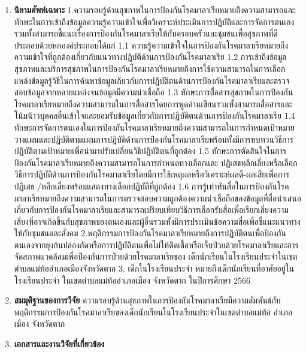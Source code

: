\begin{titlepage}
\begin{flushleft}
\begin{enumerate}
    \item\textbf{นิยามศัพท์เฉพาะ}
    1.ความรอบรู้ด้านสุขภาพในการป้องกันโรคมาลาเรียหมายถึงความสามารถและทักษะในการเข้าถึงข้อมูลความรู้ความเข้าใจเพื่อวิเคราะห์ประเมินการปฏิบัติและการจัดการตนเองรวมทั้งสามารถชี้แนะเรื่องการป้องกันโรคมาลาเรียให้กับครอบครัวและชุมชนเพื่อสุขภาพที่ดีประกอบด้วยหกองค์ประกอบได้แก่
1.1 ความรู้ความเข้าใจในการป้องกันโรคมาลาเรียหมายถึงความเข้าใจที่ถูกต้องเกี่ยวกับแนวทางปฏิบัติด้านการป้องกันโรคมาลาเรีย
1.2 การเข้าถึงข้อมูลสุขภาพและบริการสุขภาพในการป้องกันโรคมาลาเรียหมายถึงการใช้ความสามารถในการเลือกแหล่งข้อมูลรู้วิธีในการค้นหาข้อมูลเกี่ยวกับการปฏิบัติตนด้านการป้องกันโรคมาลาเรียและตรวจสอบข้อมูลจากหลายแหล่งจนข้อมูลมีความน่าเชื่อถือ 
1.3 ทักษะการสื่อสารสุขภาพในการป้องกันโรคมาลาเรียหมายถึงความสามารถในการสื่อสารโดยการพูดอ่านเขียนรวมทั้งสามารถสื่อสารและโน้มน้าวบุคคลอื่นเข้าใจและยอมรับข้อมูลเกี่ยวกับการปฏิบัติตนด้านการป้องกันโรคมาลาเรีย
1.4 ทักษะการจัดการตนเองในการป้องกันโรคมาลาเรียหมายถึงความสามารถในการกำหนดเป้าหมายวางแผนและปฏิบัติตามแผนการปฎิบัติด้านการป้องกันโรคมาลาเรียพร้อมทั้งมีการทบทวนวิธีการปฏิบัติตามเป้าหมายเพื่อนำมาปรับเปลี่ยนวิธีปฏิบัติตนที่ถูกต้อง
1.5 ทักษะการตัดสินใจในการป้องกันโรคมาลาเรียหมายถึงความสามารถในการกำหนดทางเลือกและ ปฏิเสธหลีกเลี่ยงหรือเลือกวิธีการปฏิบัติด้านการป้องกันโรคมาลาเรียโดยมีการใช้เหตุผลหรือวิเคราะห์ผลดี-ผลเสียเพื่อการปฏิเสธ /หลีกเลี่ยงพร้อมแสดงทางเลือกปฏิบัติที่ถูกต้อง
1.6 การรู้เท่าทันสื่อในการป้องกันโรคมาลาเรียหมายถึงความสามารถในการตรวจสอบความถูกต้องความน่าเชื่อถือของข้อมูลที่สื่อนำเสนอเกี่ยวกับการป้องกันโรคมาลาเรียและสามารถเปรียบเทียบวิธีการเลือกรับสื่อเพื่อเรียกเลี่ยงความเสี่ยงที่อาจเกิดขึ้นกับสุขภาพของตนเองและผู้อื่นรวมทั้งมีการประเมินข้อความสื่อเพื่อชี้แนะแนวทางให้กับชุมชนและสังคม
2.พฤติกรรมการป้องกันโรคมาลาเรียหมายถึงการปฏิบัติตนเพื่อป้องกันตนเองจากยุงก้นปล่องกัดหรือการปฏิบัติตนเพื่อไม่ให้ติดเชื้อหรือเจ็บป่วยด้วยโรคมาลาเรียและการจัดสภาพแวดล้อมเพื่อป้องกันการป่วยด้วยโรคมาลาเรียของ เด็กนักเรียนในโรงเรียนประจำในเขตตำบลแม่ท้ออำเภอเมืองจังหวัดตาก
3. เด็กในโรงเรียนประจำ หมายถึงเด็กนักเรียนที่อาศัยอยู่ในโรงเรียนประจำ ในเขตตำบลแม่ท้ออำเภอเมือง จังหวัดตาก ในปีการศึกษา 2566
    \lipsum[1-1]

    \item\textbf{สมมุติฐานของการวิจัย}
    ความรอบรู้ด้านสุขภาพในการป้องกันโรคมาลาเรียมีความสัมพันธ์กับพฤติกรรมการป้องกันโรคมาลาเรียของเด็กนักเรียนในโรงเรียนประจำในเขตตำบลแม่ท้อ อำเภอเมือง จังหวัดตาก
    \lipsum[1-1]

    \item\textbf{เอกสารและงานวิจัยที่เกี่ยวข้อง}
    
    \lipsum[1-1]


\end{enumerate}
\end{flushleft}
\end{titlepage}
